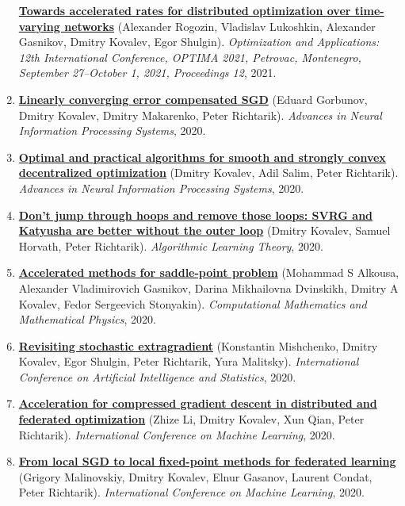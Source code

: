 \begin{enumerate}
\textbf{\href{https://link.springer.com/chapter/10.1007/978-3-030-91059-4_19}{Towards accelerated rates for distributed optimization over time-varying networks}} (Alexander Rogozin, Vladislav Lukoshkin, Alexander Gasnikov, Dmitry Kovalev, Egor Shulgin). \textit{Optimization and Applications: 12th International Conference, OPTIMA 2021, Petrovac, Montenegro, September 27–October 1, 2021, Proceedings 12}, 2021.
\item
\textbf{\href{https://proceedings.neurips.cc/paper_files/paper/2020/hash/ef9280fbc5317f17d480e4d4f61b3751-Abstract.html}{Linearly converging error compensated SGD}} (Eduard Gorbunov, Dmitry Kovalev, Dmitry Makarenko, Peter Richtarik). \textit{Advances in Neural Information Processing Systems}, 2020.
\item
\textbf{\href{https://proceedings.neurips.cc/paper_files/paper/2020/hash/d530d454337fb09964237fecb4bea6ce-Abstract.html}{Optimal and practical algorithms for smooth and strongly convex decentralized optimization}} (Dmitry Kovalev, Adil Salim, Peter Richtarik). \textit{Advances in Neural Information Processing Systems}, 2020.
\item
\textbf{\href{https://proceedings.mlr.press/v117/kovalev20a.html}{Don’t jump through hoops and remove those loops: SVRG and Katyusha are better without the outer loop}} (Dmitry Kovalev, Samuel Horvath, Peter Richtarik). \textit{Algorithmic Learning Theory}, 2020.
\item
\textbf{\href{https://link.springer.com/article/10.1134/S0965542520110020}{Accelerated methods for saddle-point problem}} (Mohammad S Alkousa, Alexander Vladimirovich Gasnikov, Darina Mikhailovna Dvinskikh, Dmitry A Kovalev, Fedor Sergeevich Stonyakin). \textit{Computational Mathematics and Mathematical Physics}, 2020.
\item
\textbf{\href{http://proceedings.mlr.press/v108/mishchenko20a}{Revisiting stochastic extragradient}} (Konstantin Mishchenko, Dmitry Kovalev, Egor Shulgin, Peter Richtarik, Yura Malitsky). \textit{International Conference on Artificial Intelligence and Statistics}, 2020.
\item
\textbf{\href{https://proceedings.mlr.press/v119/li20g.html}{Acceleration for compressed gradient descent in distributed and federated optimization}} (Zhize Li, Dmitry Kovalev, Xun Qian, Peter Richtarik). \textit{International Conference on Machine Learning}, 2020.
\item
\textbf{\href{http://proceedings.mlr.press/v119/malinovskiy20a.html}{From local SGD to local fixed-point methods for federated learning}} (Grigory Malinovskiy, Dmitry Kovalev, Elnur Gasanov, Laurent Condat, Peter Richtarik). \textit{International Conference on Machine Learning}, 2020.

\end{enumerate}
